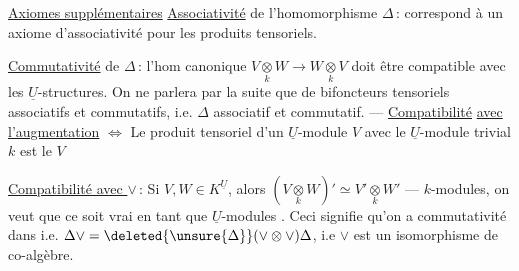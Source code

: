 \uline{Axiomes supplémentaires} \uline{Associativité} de
l'homomorphisme $\Delta$\,: correspond à un axiome
d'associativité pour les produits tensoriels.

\uline{Commutativité} de $\Delta$\,: l'hom canonique
$V\underset{k}{\otimes}W\longrightarrow W\underset{k}{\otimes}V$ doit être compatible
avec les $\underline U$-structures. On ne
parlera par la suite que de bifoncteurs
tensoriels associatifs et commutatifs, i.e. $\Delta$
associatif et commutatif. --- \uline{Compatibilité}
\uline{avec l'augmentation}  $\Longleftrightarrow$ Le produit tensoriel
d'un $\underline U$-module $V$ avec le $\underline U$-module
trivial $k$ est le  $V$

\uline{Compatibilité avec $\vee$}\,:  Si $V,W\in K^{\underline U}$,
alors $(V\underset{k}{\otimes}W)' \simeq V'\underset{k}{\otimes}W'$ --- 
$k$-modules, on veut que ce soit vrai
en tant que $\underline U$-modules . Ceci
signifie qu'on a commutativité dans
i.e. $\Delta\vee=\deleted{\unsure{\Delta}}(\vee\otimes\vee)\Delta$, i.e $\vee$ est un
isomorphisme de co-algèbre.

